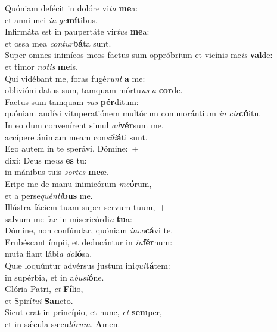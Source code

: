 \evenverse Quóniam defécit in dolóre vi\textit{ta} \textbf{me}a:~\*\\
\evenverse et anni mei \textit{in} \textit{ge}\textbf{mí}tibus.\\
\oddverse Infirmáta est in paupertáte vir\textit{tus} \textbf{me}a:~\*\\
\oddverse et ossa mea \textit{con}\textit{tur}\textbf{bá}ta sunt.\\
\evenverse Super omnes inimícos meos factus sum oppróbrium et vicínis me\textit{is} \textbf{val}de:~\*\\
\evenverse et timor \textit{no}\textit{tis} \textbf{me}is.\\
\oddverse Qui vidébant me, foras fugé\textit{runt} \textbf{a} me:~\*\\
\oddverse oblivióni datus sum, tamquam mórtu\textit{us} \textit{a} \textbf{cor}de.\\
\evenverse Factus sum tamquam \textit{vas} \textbf{pér}ditum:~\*\\
\evenverse quóniam audívi vituperatiónem multórum commorántium \textit{in} \textit{cir}\textbf{cú}itu.\\
\oddverse In eo dum convenírent simul \textit{ad}\textbf{vér}sum me,~\*\\
\oddverse accípere ánimam meam con\textit{si}\textit{li}\textbf{á}ti sunt.\\
\evenverse Ego autem in te sperávi, Dómine:~+\\
\evenverse  dixi: Deus me\textit{us} \textbf{es} tu:~\*\\
\evenverse in mánibus tuis \textit{sor}\textit{tes} \textbf{me}æ.\\
\oddverse Eripe me de manu inimicórum \textit{me}\textbf{ó}rum,~\*\\
\oddverse et a perse\textit{quén}\textit{ti}\textbf{bus} me.\\
\evenverse Illústra fáciem tuam super servum tuum,~+\\
\evenverse  salvum me fac in misericórdi\textit{a} \textbf{tu}a:~\*\\
\evenverse Dómine, non confúndar, quóniam \textit{in}\textit{vo}\textbf{cá}vi te.\\
\oddverse Erubéscant ímpii, et deducántur in \textit{in}\textbf{fér}num:~\*\\
\oddverse muta fiant lábi\textit{a} \textit{do}\textbf{ló}sa.\\
\evenverse Quæ loquúntur advérsus justum ini\textit{qui}\textbf{tá}tem:~\*\\
\evenverse in supérbia, et in a\textit{bu}\textit{si}\textbf{ó}ne.\\
\oddverse Glória Patri, \textit{et} \textbf{Fí}lio,~\*\\
\oddverse et Spirí\textit{tu}\textit{i} \textbf{San}cto.\\
\evenverse Sicut erat in princípio, et nunc, \textit{et} \textbf{sem}per,~\*\\
\evenverse et in sǽcula sæcu\textit{ló}\textit{rum}. \textbf{A}men.\\
